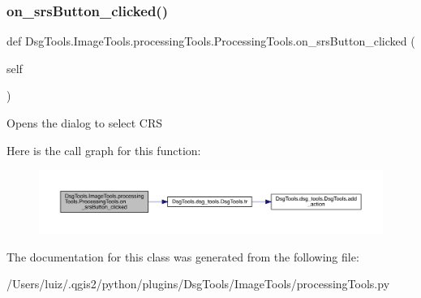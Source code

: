 \subsubsection{\texorpdfstring{on\+\_\+srs\+Button\+\_\+clicked()}{on\_srsButton\_clicked()}}
{\footnotesize\ttfamily def Dsg\+Tools.\+Image\+Tools.\+processing\+Tools.\+Processing\+Tools.\+on\+\_\+srs\+Button\+\_\+clicked (\begin{DoxyParamCaption}\item[{}]{self }\end{DoxyParamCaption})}

\begin{DoxyVerb}Opens the dialog to select CRS
\end{DoxyVerb}
 Here is the call graph for this function\+:
\nopagebreak
\begin{figure}[H]
\begin{center}
\leavevmode
\includegraphics[width=350pt]{class_dsg_tools_1_1_image_tools_1_1processing_tools_1_1_processing_tools_aa0df9a281d6ad0cf4ce21f75789bde45_cgraph}
\end{center}
\end{figure}


The documentation for this class was generated from the following file\+:\begin{DoxyCompactItemize}
\item 
/\+Users/luiz/.\+qgis2/python/plugins/\+Dsg\+Tools/\+Image\+Tools/processing\+Tools.\+py\end{DoxyCompactItemize}

